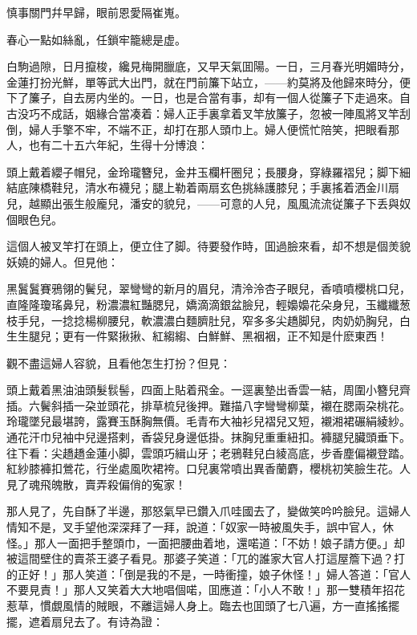\begin{myquote}
慎事關門幷早歸，眼前恩愛隔崔嵬。

春心一點如絲亂，任鎖牢籠總是虚。
\end{myquote}

白駒過隙，日月攛梭，纔見梅開臘底，又早天氣囬陽。一日，三月春光明媚時分，金蓮打扮光鮮，單等武大出門，就在門前簾下站立，——約莫將及他歸來時分，便下了簾子，自去房内坐的。一日，也是合當有事，却有一個人從簾子下走過來。自古没巧不成話，姻緣合當凑着：婦人正手裏拿着叉竿放簾子，忽被一陣風將叉竿刮倒，婦人手擎不牢，不端不正，却打在那人頭巾上。婦人便慌忙陪笑，把眼看那人，也有二十五六年紀，生得十分博浪：

\begin{myquote}
頭上戴着纓子帽兒，金玲瓏簪兒，金井玉欄杆圈兒；長腰身，穿綠羅褶兒；脚下細結底陳橋鞋兒，清水布襪兒；腿上勒着兩扇玄色挑絲護膝兒；手裏搖着洒金川扇兒，越顯出張生般龐兒，潘安的貌兒，——可意的人兒，風風流流従簾子下丢與奴個眼色兒。
\end{myquote}

這個人被叉竿打在頭上，便立住了脚。待要發作時，囬過臉來看，却不想是個羙貌妖嬈的婦人。但見他：

\begin{myquote}
黑鬒鬒賽鴉翎的鬢兒，翠彎彎的新月的眉兒，清泠泠杏子眼兒，香噴噴櫻桃口兒，直隆隆瓊瑤鼻兒，粉濃濃紅豔腮兒，嬌滴滴銀盆臉兒，輕嬝嬝花朵身兒，玉纖纖葱枝手兒，一捻捻楊柳腰兒，軟濃濃白麵臍肚兒，窄多多尖趫脚兒，肉奶奶胸兒，白生生腿兒；更有一件緊揪揪、紅縐縐、白鮮鮮、黑裀裀，正不知是什麽東西！
\end{myquote}

觀不盡這婦人容貌，且看他怎生打扮？但見：

\begin{myquote}
頭上戴着黑油油頭髮䯼髻，四面上貼着飛金。一逕裏墊出香雲一結，周圍小簪兒齊插。六鬢斜插一朶並頭花，排草梳兒後押。難描八字彎彎柳葉，襯在腮兩朶桃花。玲瓏墜兒最堪誇，露賽玉酥胸無價。毛青布大袖衫兒褶兒又短，襯湘裙碾絹綾紗。通花汗巾兒袖中兒邊搭剌，香袋兒身邊低掛。抹胸兒重重紐扣。褲腿兒臟頭垂下。往下看：尖趫趫金蓮小脚，雲頭巧緝山牙；老鴉鞋兒白綾高底，步香塵偏襯登踏。紅紗膝褲扣鶯花，行坐處風吹裙袴。口兒裏常噴出異香蘭麝，櫻桃初笑臉生花。人見了魂飛魄散，賣弄殺偏俏的寃家！
\end{myquote}

那人見了，先自酥了半邊，那怒氣早已鑽入爪哇國去了，變做笑吟吟臉兒。這婦人情知不是，叉手望他深深拜了一拜，說道：「奴家一時被風失手，誤中官人，休怪。」那人一面把手整頭巾，一面把腰曲着地，還喏道：「不妨！娘子請方便。」却被這間壁住的賣茶王婆子看見。那婆子笑道：「兀的誰家大官人打這屋簷下過？打的正好！」那人笑道：「倒是我的不是，一時衝撞，娘子休怪！」婦人答道：「官人不要見責！」那人又笑着大大地唱個喏，囬應道：「小人不敢！」那一雙積年招花惹草，慣覷風情的賊眼，不離這婦人身上。臨去也囬頭了七八遍，方一直搖搖擺擺，遮着扇兒去了。有诗為證：

